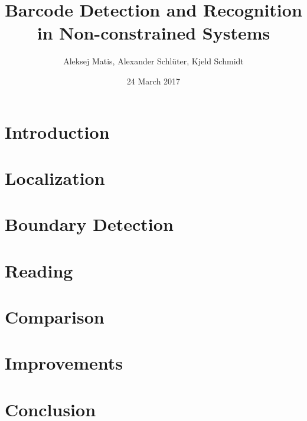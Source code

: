 \documentclass[12pt,a4paper]{article}
\author{Aleksej Matis, Alexander Schlüter, Kjeld Schmidt}
\title{Barcode Detection and Recognition in Non-constrained Systems}
\date{24 March 2017}
\begin{document}

\setcounter{page}{0}
\maketitle
\thispagestyle{empty} 
\begin{small}
\tableofcontents
\end{small}
\newpage
\section{Introduction}\label{sec:Intro}

\newpage

\section{Localization}\label{sec:Localization}

\newpage

\section{Boundary Detection} 

\newpage

\section{Reading}\label{sec:Reading}
 
\newpage

\section{Comparison} 

\newpage

\section{Improvements} 

\newpage

\section{Conclusion} 


\newpage
\appendix
\printbibliography
\end{document}
